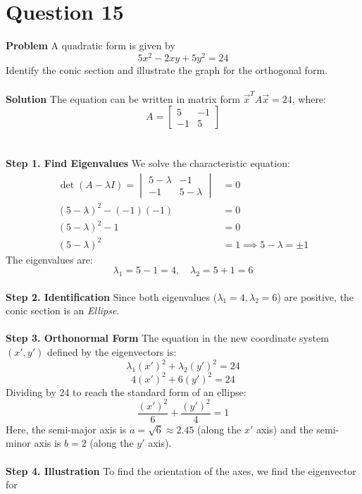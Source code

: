 \documentclass{article}
\begin{document}
\pagebreak


\section{Question 15}
\textbf{Problem}
A quadratic form is given by
\[
	5x^{2} - 2xy + 5y^{2} = 24
\]
Identify the conic section and illustrate the graph for the orthogonal form.
\\
\\
\textbf{Solution}
The equation can be written in matrix form $\vec{x}^T A \vec{x} = 24$, where:
\[
	A =
	\begin{bmatrix}
		5  & -1 \\
		-1 & 5
	\end{bmatrix}
\]
\\
\\
\textbf{Step 1. Find Eigenvalues}
We solve the characteristic equation:
\begin{align*}
	\det(A - \lambda I) =
	\begin{vmatrix}
		5 - \lambda & -1          \\
		-1          & 5 - \lambda
	\end{vmatrix} & = 0                                       \\
	(5 - \lambda)^2 - (-1)(-1)   & = 0                              \\
	(5 - \lambda)^2 - 1          & = 0                              \\
	(5 - \lambda)^2              & = 1 \implies 5 - \lambda = \pm 1
\end{align*}
The eigenvalues are:
\[
	\lambda_1 = 5 - 1 = 4, \quad \lambda_2 = 5 + 1 = 6
\]
\\
\textbf{Step 2. Identification}
Since both eigenvalues ($\lambda_1=4, \lambda_2=6$) are positive, the conic
section is an \textit{Ellipse}.
\\
\\
\textbf{Step 3. Orthonormal Form}
The equation in the new coordinate system $(x', y')$ defined by the eigenvectors
is:
\[
	\lambda_1 (x')^2 + \lambda_2 (y')^2 = 24
\]
\[
	4(x')^2 + 6(y')^2 = 24
\]
Dividing by 24 to reach the standard form of an ellipse:
\[
	\frac{(x')^2}{6} + \frac{(y')^2}{4} = 1
\]
Here, the semi-major axis is $a = \sqrt{6} \approx 2.45$ (along the $x'$ axis)
and the semi-minor axis is $b = 2$ (along the $y'$ axis).
\\
\\
\textbf{Step 4. Illustration}
To find the orientation of the axes, we find the eigenvector for
\end{document}
